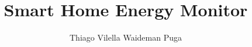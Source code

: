 \documentclass{article}
\begin{document}
%
\title{Smart Home Energy Monitor}

\author{Thiago Vilella Waideman Puga}






\maketitle 
\end{document}
